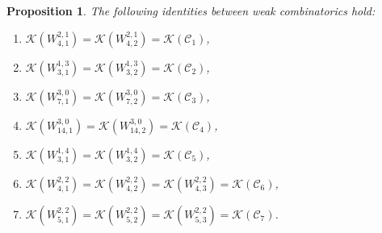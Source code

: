 \documentclass[11pt]{article}
\theoremstyle{plain}
\newtheorem{proposition}[thm]{Proposition}
\theoremstyle{definition}
\begin{document}
\begin{proposition}\label{prop:weak-same-comb}
The following identities between weak combinatorics hold:
    \begin{enumerate}[label=\normalfont{\arabic*)}]
        \item $\mathcal{K}\left(W_{4,1}^{2,1}\right)=\mathcal{K}\left(W_{4,2}^{2,1}\right)=\mathcal{K}(\mathcal{C}_1)$,
        \item $\mathcal{K}\left(W_{3,1}^{1,3}\right)=\mathcal{K}\left(W_{3,2}^{1,3}\right)=\mathcal{K}(\mathcal{C}_2)$,
        \item $\mathcal{K}\left(W_{7,1}^{3,0}\right)=\mathcal{K}\left(W_{7,2}^{3,0}\right)=\mathcal{K}(\mathcal{C}_3)$,
        \item $\mathcal{K}\left(W_{14,1}^{3,0}\right)=\mathcal{K}\left(W_{14,2}^{3,0}\right)=\mathcal{K}(\mathcal{C}_4)$,
        \item $\mathcal{K}\left(W_{3,1}^{1,4}\right)=\mathcal{K}\left(W_{3,2}^{1,4}\right)=\mathcal{K}(\mathcal{C}_5)$,
        \item $\mathcal{K}\left(W_{4,1}^{2,2}\right)=\mathcal{K}\left(W_{4,2}^{2,2}\right)=\mathcal{K}\left(W_{4,3}^{2,2}\right)=\mathcal{K}(\mathcal{C}_6)$,
        \item $\mathcal{K}\left(W_{5,1}^{2,2}\right)=\mathcal{K}\left(W_{5,2}^{2,2}\right)=\mathcal{K}\left(W_{5,3}^{2,2}\right)=\mathcal{K}(\mathcal{C}_7)$.
    \end{enumerate}
\end{proposition}
\end{document}
